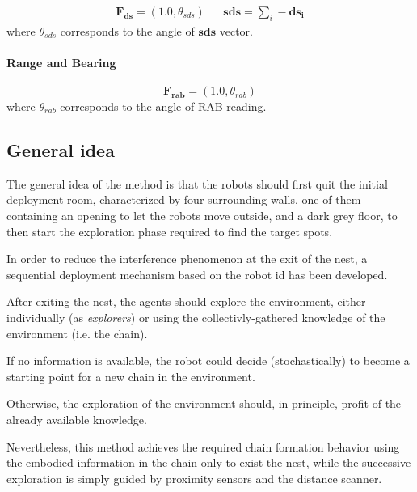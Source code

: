 \begin{align}
\mathbf{F_{ds}} = (1.0,\theta_{sds}) & & \mathbf{sds} = \sum_i -\mathbf{ds_i} 
\end{align}
where $\theta_{sds}$ corresponds to the angle of $\mathbf{sds}$ vector.

\paragraph{Range and Bearing}
\begin{equation}
\mathbf{F_{rab}} = (1.0,\theta_{rab})  
\end{equation}
where $\theta_{rab}$ corresponds to the angle of RAB reading.

\subsection{General idea}
The general idea of the method is that the robots should first quit the initial deployment room, characterized by four surrounding walls, one of them containing an opening to let the robots move outside, and a dark grey floor, to then start the exploration phase required to find the target spots.

In order to reduce the interference phenomenon at the exit of the nest, a sequential deployment mechanism based on the robot id has been developed.

After exiting the nest, the agents should explore the environment, either individually (as \emph{explorers}) or using the collectivly-gathered knowledge of the environment (i.e. the chain).

If no information is available, the robot could decide (stochastically) to become a starting point for a new chain in the environment.

Otherwise, the exploration of the environment should, in principle, profit of the already available knowledge.

Nevertheless, this method achieves the required chain formation behavior using the embodied information in the chain only to exist the nest, while the successive exploration is simply guided by proximity sensors and the distance scanner.
 

